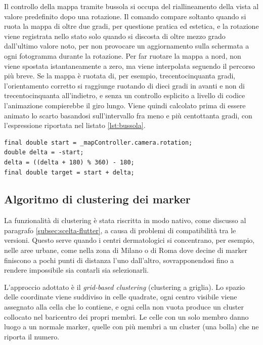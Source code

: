 Il controllo della mappa tramite bussola si occupa del riallineamento della vista al valore predefinito dopo una rotazione.
Il comando compare soltanto quando si ruota la mappa di oltre due gradi, per questione pratica ed estetica,
e la rotazione viene registrata nello stato solo quando si discosta di oltre mezzo grado dall'ultimo valore noto, per
non provocare un aggiornamento sulla schermata a ogni fotogramma durante la rotazione.
Per far ruotare la mappa a nord, non viene spostata istantaneamente a zero, ma viene interpolata seguendo il percorso
più breve.
Se la mappa è ruotata di, per esempio, trecentocinquanta gradi, l'orientamento corretto si raggiunge ruotando di dieci gradi in avanti e non di
trecentocinquanta all'indietro, e senza un controllo esplicito a livello di codice l'animazione compierebbe il giro lungo.
Viene quindi calcolato prima di essere animato lo scarto basandosi sull'intervallo fra meno e più centottanta gradi, con l'espressione
riportata nel listato \ref{lst:bussola}.

\begin{listing}[H]
\begin{verbatim}
final double start = _mapController.camera.rotation;
double delta = -start;
delta = ((delta + 180) % 360) - 180;
final double target = start + delta;
\end{verbatim}
\caption{Calcolo percorso più breve della bussola per puntare a nord.}
\label{lst:bussola}
\end{listing}


\subsection{Algoritmo di clustering dei marker}\label{subsec:impl-clustering}

La funzionalità di clustering è stata riscritta in modo nativo, come discusso al paragrafo \ref{subsec:scelta-flutter}, a causa di problemi di
compatibilità tra le versioni.
Questo serve quando i centri dermatologici si concentrano, per esempio, nelle aree urbane, come nella zona di Milano o
di Roma dove decine di marker finiscono a pochi punti di distanza l'uno dall'altro, sovrapponendosi fino a rendere impossibile
sia contarli sia selezionarli.

L'approccio adottato è il \textit{grid-based clustering} (clustering a griglia).
Lo spazio delle coordinate viene suddiviso in celle quadrate, ogni centro visibile viene assegnato alla cella che lo
contiene, e ogni cella non vuota produce un cluster collocato nel baricentro dei propri membri.
Le celle con un solo membro danno luogo a un normale marker, quelle con più membri a un cluster (una bolla) che ne riporta il numero.

